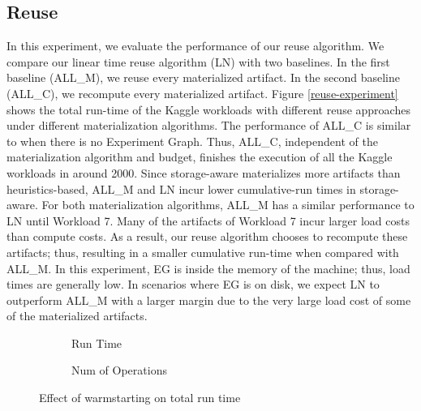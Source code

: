 \subsection{Reuse}
In this experiment, we evaluate the performance of our reuse algorithm.
We compare our linear time reuse algorithm (LN) with two baselines.
In the first baseline (ALL\_M), we reuse every materialized artifact.
In the second baseline (ALL\_C), we recompute every materialized artifact.
Figure \ref{reuse-experiment} shows the total run-time of the Kaggle workloads with different reuse approaches under different materialization algorithms.
The performance of ALL\_C is similar to when there is no Experiment Graph.
Thus, ALL\_C, independent of the materialization algorithm and budget, finishes the execution of all the Kaggle workloads in around 2000.
Since storage-aware materializes more artifacts than heuristics-based, ALL\_M and LN incur lower cumulative-run times in storage-aware.
For both materialization algorithms, ALL\_M has a similar performance to LN until Workload 7.
Many of the artifacts of Workload 7 incur larger load costs than compute costs.
As a result, our reuse algorithm chooses to recompute these artifacts; thus, resulting in a smaller cumulative run-time when compared with ALL\_M.
In this experiment, EG is inside the memory of the machine; thus, load times are generally low.
In scenarios where EG is on disk, we expect LN to outperform ALL\_M with a larger margin due to the very large load cost of some of the materialized artifacts.
\begin{figure}[h]
\begin{subfigure}[b]{0.5\linewidth}
\centering
 \resizebox{\columnwidth}{!}{%
%
}
\caption{Run Time}
\end{subfigure}%
\begin{subfigure}[b]{0.5\linewidth}
\centering
 \resizebox{\columnwidth}{!}{%
%
}
\caption{Num of Operations}
\end{subfigure}
\caption{Effect of warmstarting on total run time}
\label{exp-model-warmstarting}
\end{figure}
